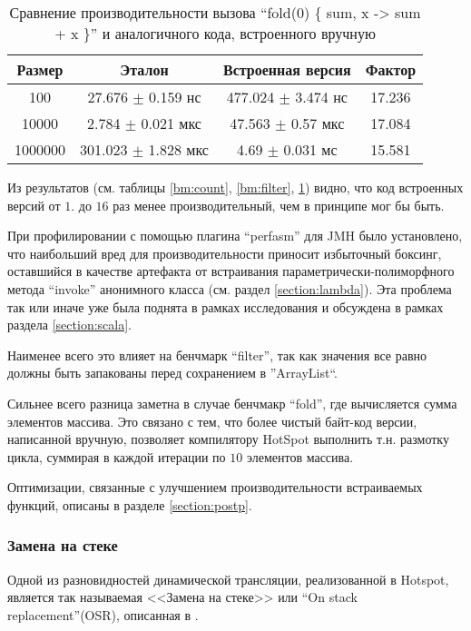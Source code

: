 \begin{table}[h]
\begin{center}
\begin{tabular}{|c|c|c|c|} \hline
Размер & Эталон & Встроенная версия & Фактор \\ \hline
100 & 27.676 $\pm$ 0.159 нс & 477.024 $\pm$ 3.474 нс & 17.236\\ \hline
10000 & 2.784 $\pm$ 0.021 мкс & 47.563 $\pm$ 0.57 мкс & 17.084\\ \hline
1000000 & 301.023 $\pm$ 1.828 мкс & 4.69 $\pm$ 0.031 мс & 15.581\\ \hline
\end{tabular}
\caption{Сравнение производительности вызова ``fold(0) \{ sum, x -> sum + x \}'' и аналогичного кода, встроенного вручную}
\label{bm:fold}
\end{center}
\end{table}

Из результатов (см. таблицы \ref{bm:count}, \ref{bm:filter}, \ref{bm:fold}) видно, что код
встроенных версий от $1.$ до $16$ раз менее производительный, чем в принципе мог бы быть.

При профилировании с помощью плагина ``perfasm'' для JMH было установлено, что наибольший вред
для производительности приносит избыточный боксинг, оставшийся в качестве артефакта от встраивания
параметрически-полиморфного метода ``invoke'' анонимного класса (см. раздел \ref{section:lambda}).
Эта проблема так или иначе уже была поднята в рамках исследования\cite{ScalaDragos} и обсуждена
в рамках раздела \ref{section:scala}.

Наименее всего это влияет на бенчмарк ``filter'', так как значения все равно должны быть запакованы
перед сохранением в ''ArrayList``.

Сильнее всего разница заметна в случае бенчмакр ``fold'', где вычисляется сумма элементов массива.
Это связано с тем, что более чистый байт-код версии, написанной вручную, позволяет компилятору
HotSpot выполнить т.н. размотку цикла, суммирая в каждой итерации по $10$ элементов массива.

Оптимизации, связанные с улучшением производительности встраиваемых функций, описаны в разделе \ref{section:postp}.

\subsubsection{Замена на стеке}
\label{section:osr:bm}
Одной из разновидностей динамической трансляции, реализованной в Hotspot, является так называемая
<<Замена на стеке>> или ``On stack replacement''(OSR), описанная в \cite{HotspotServer}.

